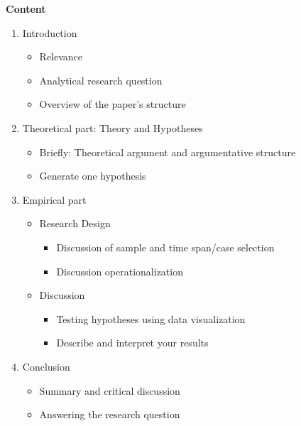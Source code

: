 \documentclass[12pt, a4paper]{article}
\begin{document}
\pagebreak
\textbf{Content}

\begin{enumerate}
\item Introduction
\begin{itemize}
\item[-] Relevance
\item[-] Analytical research question
\item[-] Overview of the paper's structure
\end{itemize}
\item Theoretical part: Theory and Hypotheses
\begin{itemize}
\item[-] Briefly: Theoretical argument and argumentative structure
\item[-] Generate one hypothesis
\end{itemize}
\item Empirical part
\begin{itemize}
\item[3.1] Research Design
\begin{itemize}
\item[-] Discussion of sample and time span/case selection
\item[-] Discussion operationalization
\end{itemize}
\item[3.2] Discussion
\begin{itemize}
\item[-] Testing hypotheses using data visualization
\item[-] Describe and interpret your results
\end{itemize}
\end{itemize}

\item Conclusion
\begin{itemize}
\item[-] Summary and critical discussion
\item[-] Answering the research question
\end{itemize}	
\end{enumerate}
\end{document}
